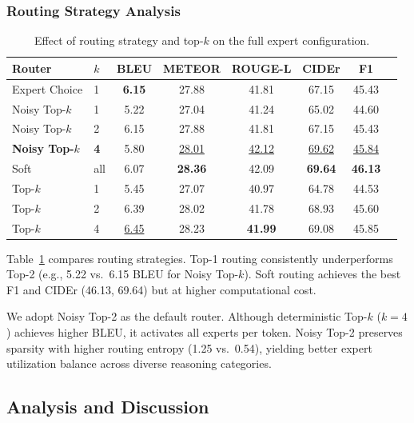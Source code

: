 \subsubsection{Routing Strategy Analysis}
\label{sec:experiments:ablation:routing}

\begin{table}[t]
\centering
\caption{Effect of routing strategy and top-$k$ on the full expert configuration.}
\label{tab:ablation_router}
\begin{tabular}{llcccccc}
\toprule
Router & $k$ & BLEU & METEOR & ROUGE-L & CIDEr & F1 \\
\midrule
Expert Choice   & 1 & \textbf{6.15} & 27.88 & 41.81 & 67.15 & 45.43 \\
Noisy Top-$k$   & 1 & 5.22 & 27.04 & 41.24 & 65.02 & 44.60 \\
Noisy Top-$k$   & 2 & 6.15 & 27.88 & 41.81 & 67.15 & 45.43 \\
\textbf{Noisy Top-$k$}   & \textbf{4} & 5.80 & \underline{28.01} & \underline{42.12} & \underline{69.62} & \underline{45.84} \\
Soft            & all & 6.07 & \textbf{28.36} & 42.09 & \textbf{69.64} & \textbf{46.13} \\
Top-$k$         & 1 & 5.45 & 27.07 & 40.97 & 64.78 & 44.53 \\
Top-$k$         & 2 & 6.39 & 28.02 & 41.78 & 68.93 & 45.60 \\
Top-$k$         & 4 & \underline{6.45} & 28.23 & \textbf{41.99} & 69.08 & 45.85 \\
\bottomrule
\end{tabular}
\end{table}

Table~\ref{tab:ablation_router} compares routing strategies. Top-1 routing consistently underperforms Top-2 (e.g., 5.22 vs.\ 6.15 BLEU for Noisy Top-$k$). Soft routing achieves the best F1 and CIDEr (46.13, 69.64) but at higher computational cost.

We adopt Noisy Top-2 as the default router. Although deterministic Top-$k$ ($k{=}4$) achieves higher BLEU, it activates all experts per token. Noisy Top-2 preserves sparsity with higher routing entropy (1.25 vs.\ 0.54), yielding better expert utilization balance across diverse reasoning categories.

\subsection{Analysis and Discussion}
\label{sec:experiments:analysis}

